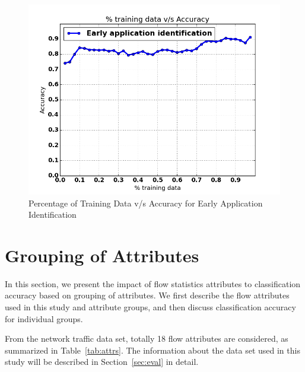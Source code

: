\documentclass[conference]{IEEEtran}
\begin{document}
\begin{figure}[!t]
	\centering
	\includegraphics[width=1\columnwidth]{early_application_result}
	\caption{Percentage of Training Data v/s Accuracy for Early Application Identification}
	\label{fig:early_app_identification}
\end{figure}

\section{Grouping of Attributes}
\label{sec:grouping}

In this section, we present the impact of flow statistics attributes to classification accuracy based on grouping of attributes.
We first describe the flow attributes used in this study and attribute groups, and then discuss classification accuracy for individual groups.

From the network traffic data set, totally 18 flow attributes are considered, as summarized in Table~\ref{tab:attrs}.
The information about the data set used in this study will be described in Section~\ref{sec:eval} in detail.
\end{document}
